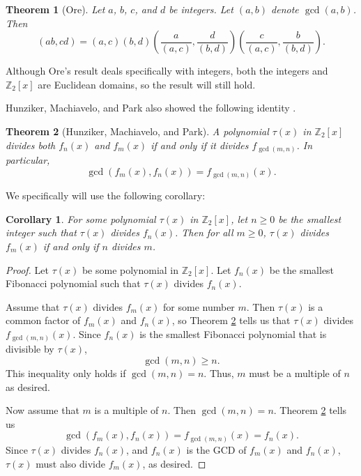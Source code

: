 \documentclass[a4paper]{article}
\newtheorem{theorem}{Theorem}[section]
\newtheorem{corollary}{Corollary}[theorem]
\newcommand{\Z}{\mathbb{Z}}
\begin{document}
	\begin{theorem}[Ore]\label{Ore_gcd}
		Let $a$, $b$, $c$, and $d$ be integers.
		Let $(a,b)$ denote $\gcd{(a,b)}$.
		Then
		\begin{equation*}
			(ab,cd) = (a,c)(b,d)\left(\frac{a}{(a,c)},\frac{d}{(b,d)}\right)\left(\frac{c}{(a,c)},\frac{b}{(b,d)}\right).
		\end{equation*}
	\end{theorem}

	Although Ore's result deals specifically with integers, both the integers and $\Z_2[x]$ are Euclidean domains, so the result will still hold.
	
	Hunziker, Machiavelo, and Park also showed the following identity \cite{HUNZIKER2004465}.
	\begin{theorem}[Hunziker, Machiavelo, and Park]\label{HMP_gcd}
		A polynomial $\tau(x)$ in $\Z_2[x]$ divides both $f_n(x)$ and $f_m(x)$ if and only if it divides $f_{\gcd{(m,n)}}$.
		In particular,
		\begin{equation*}
			\gcd{\left(f_m(x), f_n(x)\right)} = f_{\gcd{(m,n)}}(x).
		\end{equation*}
	\end{theorem}

	We specifically will use the following corollary:
	\begin{corollary}\label{cor_HMP_gcd}
		For some polynomial $\tau(x)$ in $\Z_2[x]$, let $n \geq 0$ be the smallest integer such that $\tau(x)$ divides $f_n(x)$.
		Then for all $m \geq 0$, $\tau(x)$ divides $f_m(x)$ if and only if $n$ divides $m$.
	\end{corollary}
	\begin{proof}
		Let $\tau(x)$ be some polynomial in $\Z_2[x]$.
		Let $f_n(x)$ be the smallest Fibonacci polynomial such that $\tau(x)$ divides $f_n(x)$.
		
		Assume that $\tau(x)$ divides $f_m(x)$ for some number $m$.
		Then $\tau(x)$ is a common factor of $f_m(x)$ and $f_n(x)$, so Theorem \ref{HMP_gcd} tells us that $\tau(x)$ divides $f_{\gcd{(m,n)}}(x)$.
		Since $f_n(x)$ is the smallest Fibonacci polynomial that is divisible by $\tau(x)$,
		\begin{equation*}
			\gcd{(m,n)} \geq n.
		\end{equation*}
		This inequality only holds if $\gcd{(m,n)} = n$.
		Thus, $m$ must be a multiple of $n$ as desired.
		
		Now assume that $m$ is a multiple of $n$.
		Then $\gcd{(m,n)} = n$.
		Theorem \ref{HMP_gcd} tells us
		\begin{equation*}
			\gcd{\left(f_m(x), f_n(x)\right)} = f_{\gcd{(m,n)}}(x) = f_n(x).
		\end{equation*}
		Since $\tau(x)$ divides $f_n(x)$, and $f_n(x)$ is the GCD of $f_m(x)$ and $f_n(x)$, $\tau(x)$ must also divide $f_m(x)$, as desired.
	\end{proof}
\end{document}
